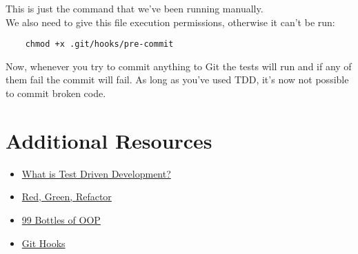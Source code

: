 This is just the command that we've been running manually.
\\

We also need to give this file execution permissions, otherwise it can't be run:

\begin{verbatim}
    chmod +x .git/hooks/pre-commit
\end{verbatim}

Now, whenever you try to commit anything to Git the tests will run and if any of them fail the commit will fail. As long as you've used TDD, it's now not possible to commit broken code.


\section{Additional Resources}

\begin{itemize}[leftmargin=*]
    \item \href{https://www.freecodecamp.org/news/test-driven-development-what-it-is-and-what-it-is-not-41fa6bca02a2/}{What is Test Driven Development?}
    \item \href{https://www.codecademy.com/articles/tdd-red-green-refactor}{Red, Green, Refactor}
    \item \href{https://www.sandimetz.com/99bottles}{99 Bottles of OOP}
    \item \href{https://git-scm.com/book/en/v2/Customizing-Git-Git-Hooks}{Git Hooks}
\end{itemize}

